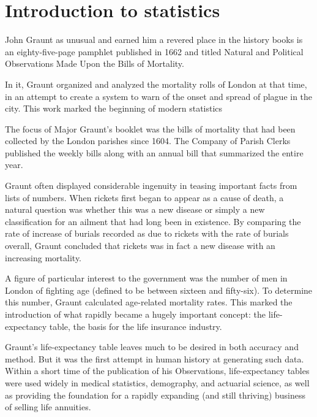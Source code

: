 \chapter{Introduction to statistics}

John Graunt as unusual and earned him a revered place in the history books is an eighty-five-page pamphlet published in 1662 and titled Natural and Political Observations Made Upon the Bills of Mortality.

In it, Graunt organized and analyzed the mortality rolls of London at that time, in an attempt to create a system to warn of the onset and spread of plague in the city. This work marked the beginning of modern statistics

The focus of Major Graunt’s booklet was the bills of mortality that had been collected by the London parishes since 1604. The Company of Parish Clerks published the weekly bills along with an annual bill that summarized the entire year.

Graunt often displayed considerable ingenuity in teasing important facts from lists of numbers. When rickets first began to appear as a cause of death, a natural question was whether this was a new disease or simply a new classification for an ailment that had long been in existence. By comparing the rate of increase of burials recorded as due to rickets with the rate of burials overall, Graunt concluded that rickets was in fact a new disease with an increasing mortality.

A figure of particular interest to the government was the number of men in London of fighting age (defined to be between sixteen and fifty-six). To determine this number, Graunt calculated age-related mortality rates. This marked the introduction of what rapidly became a hugely important concept: the life-expectancy table, the basis for the life insurance industry.

Graunt’s life-expectancy table leaves much to be desired in both accuracy and method. But it was the first attempt in human history at generating such data. Within a short time of the publication of his Observations, life-expectancy tables were used widely in medical statistics, demography, and actuarial science, as well as providing the foundation for a rapidly expanding (and still thriving) business of selling life annuities.

